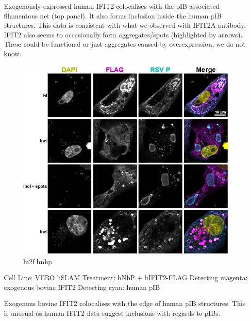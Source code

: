 Exogenously expressed human IFIT2 colocalises with the pIB associated filamentous net (top panel). It also forms inclusion inside the human pIB structures. This data is consistent with what we observed with IFIT2A antibody. IFIT2 also seems to occasionally form aggregates/spots (highlighted by arrows). These could be functional or just aggregates caused by overexpression, we do not know.

\begin{figure}
    \centering
    \includegraphics[width=1\linewidth]{09. Chapter 4//Figs//03. IFIT2-FLAG/02. hi2f hnhp.png}
    \caption[hi2f hnhp]{hi2f hnhp}
    \label{hi2f hnhp}
\end{figure}

Cell Line: VERO hSLAM \newline
Treatment: hNhP + bIFIT2-FLAG \newline
Detecting magenta: exogenous bovine IFIT2 \newline
Detecting cyan: human pIB \newline

Exogenous bovine IFIT2 colocalises with the edge of human pIB structures. This is unusual as human IFIT2 data suggest inclusions with regards to pIBs.

